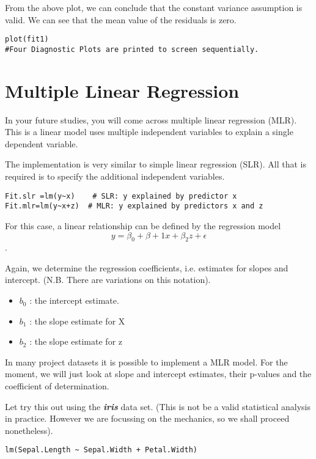 \documentclass[ModuleBmain.tex]{subfiles}
\begin{document}
From the above plot, we can conclude that the constant variance assumption is valid. We can see that the mean value of the residuals is zero.
\begin{framed}
\begin{verbatim}
plot(fit1)
#Four Diagnostic Plots are printed to screen sequentially.
\end{verbatim}
\end{framed}
\newpage
\section{Multiple Linear Regression}
In your future studies, you will come across multiple linear regression (MLR). This is a linear model uses multiple independent variables to explain a single dependent variable.

The implementation is very similar to simple linear regression (SLR). All that is required is to specify the additional independent variables.

\begin{framed}
\begin{verbatim}
Fit.slr =lm(y~x)  	# SLR: y explained by predictor x
Fit.mlr=lm(y~x+z)  # MLR: y explained by predictors x and z
\end{verbatim}
\end{framed}

For this case, a  linear relationship can be defined by the regression model  \[y =\beta_0 + \beta+1x + \beta_2z + \epsilon\].

Again, we determine the regression coefficients, i.e. estimates for slopes and intercept. (N.B. There are variations on this notation).

\begin{itemize}
\item	$b_0$ : the intercept estimate.
\item	$b_1$  : the slope estimate for X
\item	$b_2$  : the slope estimate for z
\end{itemize}

In many project datasets it is possible to implement a MLR model. For the moment, we will just look at slope and intercept estimates, their p-values and the coefficient of determination.

Let try this out using the \textbf{\textit{iris}} data set. (This is not be a valid statistical analysis in practice. However we are focussing on the mechanics, so we shall proceed nonetheless).
\begin{framed}
\begin{verbatim}
lm(Sepal.Length ~ Sepal.Width + Petal.Width)
\end{verbatim}
\end{framed}
\end{document}
